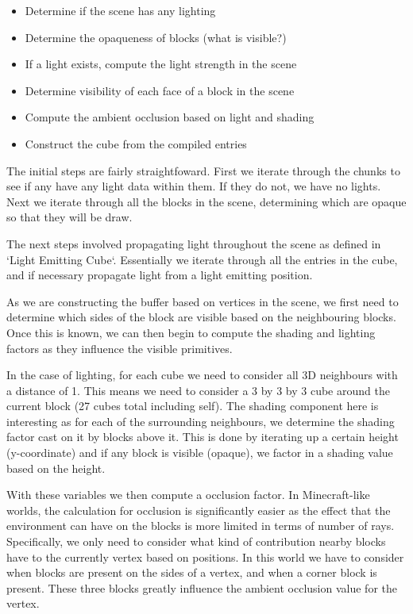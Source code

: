 \documentclass{book}
\begin{document}
\begin{itemize}
	\item Determine if the scene has any lighting
	\item Determine the opaqueness of blocks (what is visible?)
	\item If a light exists, compute the light strength in the scene
	\item Determine visibility of each face of a block in the scene
	\item Compute the ambient occlusion based on light and shading
	\item Construct the cube from the compiled entries
\end{itemize}
    
The initial steps are fairly straightfoward.  First we iterate through the chunks to see if any have any light data within them.  If they do not, we have no lights.  Next we iterate through all the blocks in the scene, determining which are opaque so that they will be draw.
    
The next steps involved propagating light throughout the scene as defined in `Light Emitting Cube`. Essentially we iterate through all the entries in the cube, and if necessary propagate light from a light emitting position.
    
As we are constructing the buffer based on vertices in the scene, we first need to determine which sides of the block are visible based on the neighbouring blocks.  Once this is known, we can then begin to compute the shading and lighting factors as they influence the visible primitives.
    
In the case of lighting, for each cube we need to consider all 3D neighbours with a distance of 1.  This means we need to consider a 3 by 3 by 3 cube around the current block (27 cubes total including self).  The shading component here is interesting as for each of the surrounding neighbours, we determine the shading factor cast on it by blocks above it.  This is done by iterating up a certain height (y-coordinate) and if any block is visible (opaque), we factor in a shading value based on the height.
    
With these variables we then compute a occlusion factor.  In Minecraft-like worlds, the calculation for occlusion is significantly easier as the effect that the environment can have on the blocks is more limited in terms of number of rays.  Specifically, we only need to consider what kind of contribution nearby blocks have to the currently vertex based on positions.  In this world we have to consider when blocks are present on the sides of a vertex, and when a corner block is present.  These three blocks greatly influence the ambient occlusion value for the vertex.
    
\end{document}

